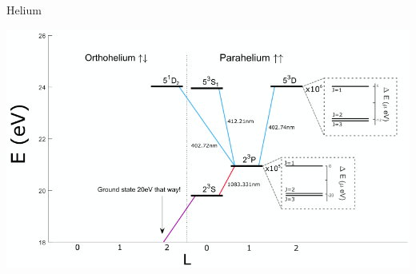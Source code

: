 \documentclass{beamer}
\begin{document}



\begin{frame}{Helium}
     \begin{center}
    \includegraphics[width=\textwidth]{figures/spectroscopy_level_diagram.png}
     \end{center}
\end{frame}
\end{document}
